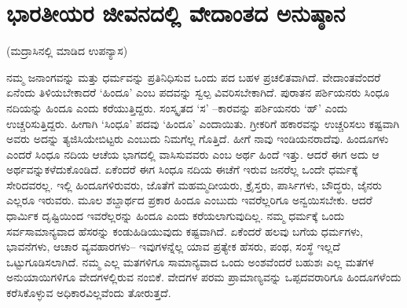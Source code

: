 
\chapter{ಭಾರತೀಯರ ಜೀವನದಲ್ಲಿ ವೇದಾಂತದ ಅನುಷ್ಠಾನ}

\begin{center}
(ಮದ್ರಾಸಿನಲ್ಲಿ ಮಾಡಿದ ಉಪನ್ಯಾಸ)
\end{center}

ನಮ್ಮ ಜನಾಂಗವನ್ನು ಮತ್ತು ಧರ್ಮವನ್ನು ಪ್ರತಿನಿಧಿಸುವ ಒಂದು ಪದ ಬಹಳ ಪ್ರಚಲಿತವಾಗಿದೆ. ವೇದಾಂತವೆಂದರೆ ಏನೆಂದು ತಿಳಿಯಬೇಕಾದರೆ ‘ಹಿಂದೂ’ ಎಂಬ ಪದವನ್ನು ಸ್ವಲ್ಪ ವಿವರಿಸಬೇಕಾಗಿದೆ. ಪುರಾತನ ಪರ್ಶಿಯನರು ಸಿಂಧೂ ನದಿಯನ್ನು ಹಿಂದೂ ಎಂದು ಕರೆಯುತ್ತಿದ್ದರು. ಸಂಸ್ಕೃತದ ‘ಸ’ –ಕಾರವನ್ನು ಪರ್ಶಿಯನರು ‘ಹ್​’ ಎಂದು ಉಚ್ಚರಿಸುತ್ತಿದ್ದರು. ಹೀಗಾಗಿ ‘ಸಿಂಧೂ’ ಪದವು ‘ಹಿಂದೂ’ ಎಂದಾಯಿತು. ಗ್ರೀಕರಿಗೆ ಹಕಾರವನ್ನು ಉಚ್ಚರಿಸಲು ಕಷ್ಟವಾಗಿ ಅವರು ಅದನ್ನು ತ್ಯಜಿಸಿಯೇಬಿಟ್ಟರು ಎಂಬುದು ನಿಮಗೆಲ್ಲ ಗೊತ್ತಿದೆ. ಹೀಗೆ ನಾವು ಇಂಡಿಯನರಾದೆವು. ಹಿಂದೂಗಳು ಎಂದರೆ ಸಿಂಧೂ ನದಿಯ ಆಚೆಯ ಭಾಗದಲ್ಲಿ ವಾಸಿಸುವವರು ಎಂಬ ಅರ್ಥ ಹಿಂದೆ ಇತ್ತು. ಆದರೆ ಈಗ ಅದು ಆ ಅರ್ಥವನ್ನುಕಳೆದುಕೊಂಡಿದೆ. ಏಕೆಂದರೆ ಈಗ ಸಿಂಧೂ ನದಿಯ ಈಚೆಗೆ ಇರುವ ಜನರೆಲ್ಲ ಒಂದೇ ಧರ್ಮಕ್ಕೆ ಸೇರಿದವರಲ್ಲ. ಇಲ್ಲಿ ಹಿಂದೂಗಳಿರುವರು, ಜೊತೆಗೆ ಮಹಮ್ಮದೀಯರು, ಕ್ರೈಸ್ತರು, ಪಾರ್ಸಿಗಳು, ಬೌದ್ಧರು, ಜೈನರು ಎಲ್ಲರೂ ಇರುವರು. ಮೂಲ ಶಬ್ದಾರ್ಥದ ಪ್ರಕಾರ ಹಿಂದೂ ಎಂಬುದು ಇವರೆಲ್ಲರಿಗೂ ಅನ್ವಯಿಸಬೇಕು. ಆದರೆ ಧಾರ್ಮಿಕ ದೃಷ್ಟಿಯಿಂದ ಇವರೆಲ್ಲರನ್ನು ಹಿಂದೂ ಎಂದು ಕರೆಯಲಾಗುವುದಿಲ್ಲ. ನಮ್ಮ ಧರ್ಮಕ್ಕೆ ಒಂದು ಸರ್ವಸಾಮಾನ್ಯವಾದ ಹೆಸರನ್ನು ಕಂಡುಹಿಡಿಯುವುದು ಕಷ್ಟವಾಗಿದೆ. ಏಕೆಂದರೆ ಹಲವು ಬಗೆಯ ಧರ್ಮಗಳು, ಭಾವನೆಗಳು, ಆಚಾರ ವ್ಯವಹಾರಗಳು– ಇವುಗಳನ್ನೆಲ್ಲ ಯಾವ ಪ್ರತ್ಯೇಕ ಹೆಸರು, ಪಂಥ, ಸಂಸ್ಥೆ ಇಲ್ಲದೆ ಒಟ್ಟುಗೂಡಿಸಲಾಗಿದೆ. ನಮ್ಮ ಎಲ್ಲ ಮತಗಳಿಗೂ ಸಾಮಾನ್ಯವಾದ ಒಂದು ಅಂಶವೆಂದರೆ ಬಹುಶಃ ಎಲ್ಲ ಮತಗಳ ಅನುಯಾಯಿಗಳಿಗೂ ವೇದಗಳಲ್ಲಿರುವ ನಂಬಿಕೆ. ವೇದಗಳ ಪರಮ ಪ್ರಾಮಾಣ್ಯವನ್ನು ಒಪ್ಪದವರಾರಿಗೂ ಹಿಂದೂಗಳೆಂದು ಕರೆಸಿಕೊಳ್ಳುವ ಅಧಿಕಾರವಿಲ್ಲವೆಂದು ತೋರುತ್ತದೆ.

\newpage

